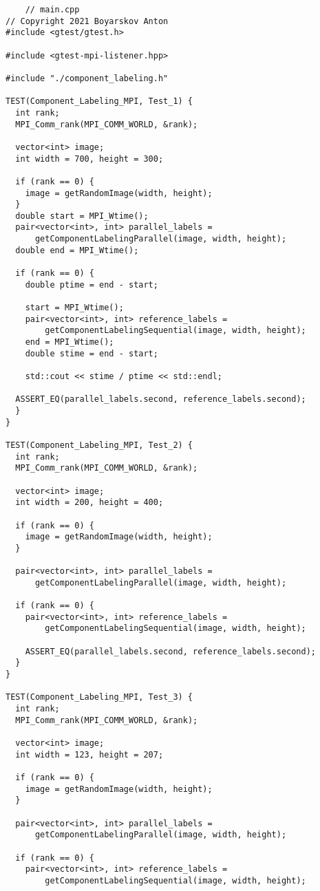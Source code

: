 \documentclass{report}
\begin{document}
	\begin{lstlisting}
	// main.cpp
// Copyright 2021 Boyarskov Anton
#include <gtest/gtest.h>

#include <gtest-mpi-listener.hpp>

#include "./component_labeling.h"

TEST(Component_Labeling_MPI, Test_1) {
  int rank;
  MPI_Comm_rank(MPI_COMM_WORLD, &rank);

  vector<int> image;
  int width = 700, height = 300;

  if (rank == 0) {
    image = getRandomImage(width, height);
  }
  double start = MPI_Wtime();
  pair<vector<int>, int> parallel_labels =
      getComponentLabelingParallel(image, width, height);
  double end = MPI_Wtime();

  if (rank == 0) {
    double ptime = end - start;

    start = MPI_Wtime();
    pair<vector<int>, int> reference_labels =
        getComponentLabelingSequential(image, width, height);
    end = MPI_Wtime();
    double stime = end - start;

    std::cout << stime / ptime << std::endl;

  ASSERT_EQ(parallel_labels.second, reference_labels.second);
  }
}

TEST(Component_Labeling_MPI, Test_2) {
  int rank;
  MPI_Comm_rank(MPI_COMM_WORLD, &rank);

  vector<int> image;
  int width = 200, height = 400;

  if (rank == 0) {
    image = getRandomImage(width, height);
  }

  pair<vector<int>, int> parallel_labels =
      getComponentLabelingParallel(image, width, height);

  if (rank == 0) {
    pair<vector<int>, int> reference_labels =
        getComponentLabelingSequential(image, width, height);

    ASSERT_EQ(parallel_labels.second, reference_labels.second);
  }
}

TEST(Component_Labeling_MPI, Test_3) {
  int rank;
  MPI_Comm_rank(MPI_COMM_WORLD, &rank);

  vector<int> image;
  int width = 123, height = 207;

  if (rank == 0) {
    image = getRandomImage(width, height);
  }

  pair<vector<int>, int> parallel_labels =
      getComponentLabelingParallel(image, width, height);

  if (rank == 0) {
    pair<vector<int>, int> reference_labels =
        getComponentLabelingSequential(image, width, height);


\end{lstlisting}
\end{document}
